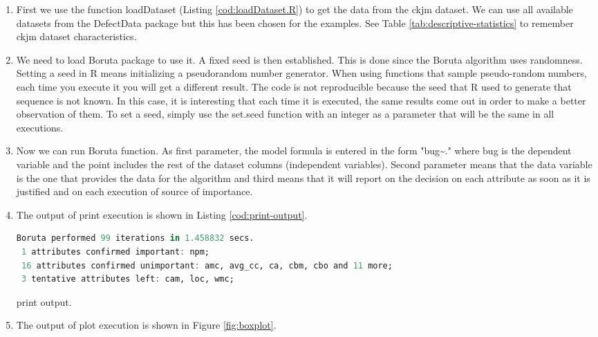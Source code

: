 \begin{enumerate}
    \item First we use the function loadDataset (Listing \ref{cod:loadDataset.R}) to get the data from the ckjm dataset. We can use all available datasets from the DefectData package but this has been chosen for the examples. See Table \ref{tab:descriptive-statistics} to remember ckjm dataset characteristics.
    
    \item We need to load Boruta package to use it. A fixed seed is then established. This is done since the Boruta algorithm uses randomness. Setting a seed in R means initializing a pseudorandom number generator. When using functions that sample pseudo-random numbers, each time you execute it you will get a different result. The code is not reproducible because the seed that R used to generate that sequence is not known. In this case, it is interesting that each time it is executed, the same results come out in order to make a better observation of them. To set a seed, simply use the set.seed function with an integer as a parameter that will be the same in all executions.
    
    \item Now we can run Boruta function. As first parameter, the model formula is entered in the form "bug\~{ }." where bug is the dependent variable and the point includes the rest of the dataset columns (independent variables). Second parameter means that the data variable is the one that provides the data for the algorithm and third means that it will report on the decision on each attribute as soon as it is justified and on each execution of source of importance.
    
    \item The output of print execution is shown in Listing \ref{cod:print-output}.
    
\begin{codefloat}[H]
\begin{lstlisting}[language=R, style=console]
Boruta performed 99 iterations in 1.458832 secs.
 1 attributes confirmed important: npm;
 16 attributes confirmed unimportant: amc, avg_cc, ca, cbm, cbo and 11 more;
 3 tentative attributes left: cam, loc, wmc;
\end{lstlisting}
\caption{print output.}
\label{cod:print-output}
\end{codefloat}

    \item The output of plot execution is shown in Figure \ref{fig:boxplot}.
    

\end{enumerate}
